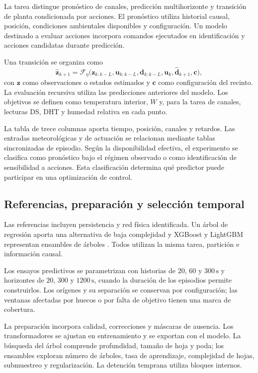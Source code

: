 La tarea distingue pronóstico de canales, predicción multihorizonte y transición de planta condicionada por acciones. El pronóstico utiliza historial causal, posición, condiciones ambientales disponibles y configuración. Un modelo destinado a evaluar acciones incorpora comandos ejecutados en identificación y acciones candidatas durante predicción.

Una transición se organiza como
\begin{equation}
\widehat{\mathbf z}_{k+1}=\mathcal F_\eta
\bigl(\mathbf z_{k:k-L},\mathbf u_{k:k-L},\mathbf d_{k:k-L},
\mathbf u_k,\widehat{\mathbf d}_{k+1},\mathbf c\bigr),
\label{met:predictor_dinamico}
\end{equation}
con $\mathbf z$ como observaciones o estados estimados y $\mathbf c$ como configuración del recinto. La evaluación recursiva utiliza las predicciones anteriores del modelo. Los objetivos se definen como temperatura interior, $W$ y, para la tarea de canales, lecturas DS, DHT y humedad relativa en cada punto.

La tabla de trece columnas aporta tiempo, posición, canales y retardos. Las entradas meteorológicas y de actuación se relacionan mediante tablas sincronizadas de episodio. Según la disponibilidad efectiva, el experimento se clasifica como pronóstico bajo el régimen observado o como identificación de sensibilidad a acciones. Esta clasificación determina qué predictor puede participar en una optimización de control.

\subsection{Referencias, preparación y selección temporal}

Las referencias incluyen persistencia y red física identificada. Un árbol de regresión aporta una alternativa de baja complejidad y XGBoost y LightGBM representan ensambles de árboles \cite{friedman2001,chen2016,ke2017}. Todos utilizan la misma tarea, partición e información causal.

Los ensayos predictivos se parametrizan con historias de $20$, $60$ y $300\,\mathrm s$ y horizontes de $20$, $300$ y $1200\,\mathrm s$, cuando la duración de los episodios permite construirlos. Los orígenes y su separación se conservan por configuración; las ventanas afectadas por huecos o por falta de objetivo tienen una marca de cobertura.

La preparación incorpora calidad, correcciones y máscaras de ausencia. Los transformadores se ajustan en entrenamiento y se exportan con el modelo. La búsqueda del árbol comprende profundidad, tamaño de hoja y poda; los ensambles exploran número de árboles, tasa de aprendizaje, complejidad de hojas, submuestreo y regularización. La detención temprana utiliza bloques internos.

